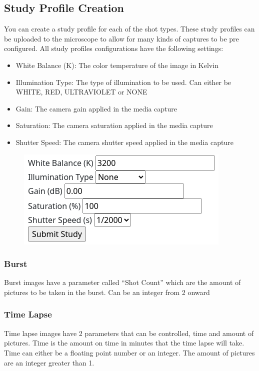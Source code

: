 \documentclass[12pt]{article}
\begin{document}
\begin{center}
	\subsection{Study Profile Creation}
	You can create a study profile for each of the shot types. These study profiles can be uploaded to the microscope to allow for many kinds of captures to be pre configured. All study profiles configurations have the following settings:
	\begin{itemize}
		\item White Balance (K): The color temperature of the image in Kelvin
		\item Illumination Type: The type of illumination to be used. Can either be WHITE, RED, ULTRAVIOLET or NONE
		\item Gain: The camera gain applied in the media capture
		\item Saturation: The camera saturation applied in the media capture
		\item Shutter Speed: The camera shutter speed applied in the media capture
	\end{itemize}
	\begin{figure}[H]
		\includegraphics[width=\textwidth]{Figures/Study-Profile.png}
	\end{figure}
	\subsubsection{Burst}
	Burst images have a parameter called ``Shot Count'' which are the amount of pictures to be taken in the burst. Can be an integer from 2 onward
	\subsubsection{Time Lapse}
	Time lapse images have 2 parameters that can be controlled, time and amount of pictures. Time is the amount on time in minutes that the time lapse will take. Time can either be a floating point number or an integer. The amount of pictures are an integer greater than 1.

\end{center}
\end{document}
